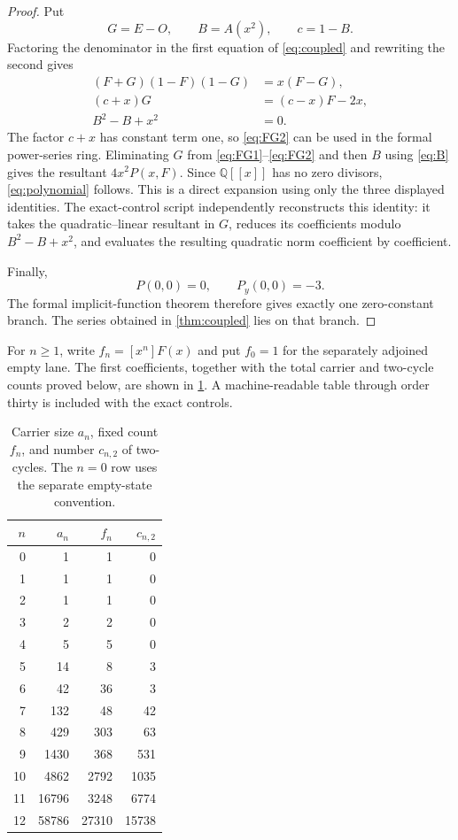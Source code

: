 \documentclass[10pt,a4paper]{amsart}
\theoremstyle{definition}
\theoremstyle{remark}
\begin{document}
\begin{proof}
Put
\[
 G=E-O,\qquad B=A(x^2),\qquad c=1-B.
\]
Factoring the denominator in the first equation of \eqref{eq:coupled} and
rewriting the second gives
\begin{align}
 (F+G)(1-F)(1-G)&=x(F-G),                                  \label{eq:FG1}\\
 (c+x)G&=(c-x)F-2x,                                        \label{eq:FG2}\\
 B^2-B+x^2&=0.                                             \label{eq:B}
\end{align}
The factor $c+x$ has constant term one, so \eqref{eq:FG2} can be used in the
formal power-series ring.  Eliminating $G$ from \eqref{eq:FG1}--\eqref{eq:FG2}
and then $B$ using \eqref{eq:B} gives the resultant
$4x^2P(x,F)$.  Since $\mathbb Q[[x]]$ has no zero divisors,
\eqref{eq:polynomial} follows.  This is a direct expansion using only the
three displayed identities.  The exact-control script independently
reconstructs this identity: it takes the quadratic--linear resultant in
$G$, reduces its coefficients modulo $B^2-B+x^2$, and evaluates the
resulting quadratic norm coefficient by coefficient.

Finally,
\[
             P(0,0)=0,\qquad P_y(0,0)=-3.
\]
The formal implicit-function theorem therefore gives exactly one
zero-constant branch.  The series obtained in \cref{thm:coupled} lies on
that branch.
\end{proof}

For $n\geq1$, write $f_n=[x^n]F(x)$ and put $f_0=1$ for the separately
adjoined empty lane.  The first coefficients, together with the total
carrier and two-cycle counts proved below, are shown in
\cref{tab:coefficients}.  A machine-readable table through order thirty is
included with the exact controls.

\begin{table}[H]
\centering
\small
\caption{Carrier size $a_n$, fixed count $f_n$, and number $c_{n,2}$ of
two-cycles.  The $n=0$ row uses the separate empty-state convention.}
\label{tab:coefficients}
\begin{tabular}{r@{\quad}r@{\quad}r@{\quad}r}
\toprule
$n$ & $a_n$ & $f_n$ & $c_{n,2}$\\
\midrule
0&1&1&0\\
1&1&1&0\\
2&1&1&0\\
3&2&2&0\\
4&5&5&0\\
5&14&8&3\\
6&42&36&3\\
7&132&48&42\\
8&429&303&63\\
9&1430&368&531\\
10&4862&2792&1035\\
11&16796&3248&6774\\
12&58786&27310&15738\\
\bottomrule
\end{tabular}
\end{table}
\end{document}
